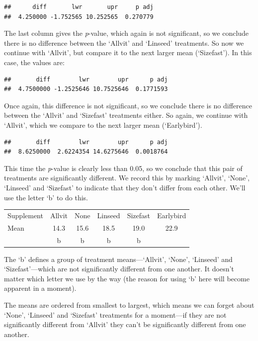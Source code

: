 \documentclass[
]{book}
\begin{document}
\begin{verbatim}
##      diff       lwr       upr     p adj 
##  4.250000 -1.752565 10.252565  0.270779
\end{verbatim}

The last column gives the \emph{p}-value, which again is not significant, so we conclude there is no difference between the `Allvit' and `Linseed' treatments. So now we continue with `Allvit', but compare it to the next larger mean (`Sizefast'). In this case, the values are:

\begin{verbatim}
##       diff        lwr        upr      p adj 
##  4.7500000 -1.2525646 10.7525646  0.1771593
\end{verbatim}

Once again, this difference is not significant, so we conclude there is no difference between the `Allvit' and `Sizefast' treatments either. So again, we continue with `Allvit', which we compare to the next larger mean (`Earlybird').

\begin{verbatim}
##       diff        lwr        upr      p adj 
##  8.6250000  2.6224354 14.6275646  0.0018764
\end{verbatim}

This time the \emph{p}-value is clearly less than 0.05, so we conclude that this pair of treatments are significantly different. We record this by marking `Allvit', `None', `Linseed' and `Sizefast' to indicate that they don't differ from each other. We'll use the letter `b' to do this.

\begin{longtable}[]{@{}lccccc@{}}
\toprule()
\endhead
Supplement & Allvit & None & Linseed & Sizefast & Earlybird \\
Mean & 14.3 & 15.6 & 18.5 & 19.0 & 22.9 \\
& b & b & b & b & \\
\bottomrule()
\end{longtable}

The `b' defines a group of treatment means---`Allvit', `None', `Linseed' and `Sizefast'---which are not significantly different from one another. It doesn't matter which letter we use by the way (the reason for using `b' here will become apparent in a moment).

The means are ordered from smallest to largest, which means we can forget about `None', `Linseed' and `Sizefast' treatments for a moment---if they are not significantly different from `Allvit' they can't be significantly different from one another.
\end{document}
